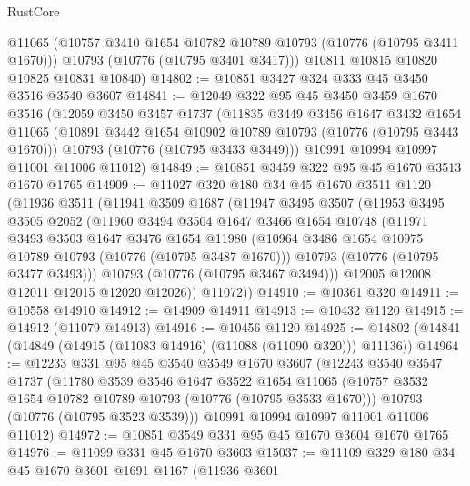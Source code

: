 \begin{lexlean}{RustCore}
\begin{coremodule}
        @11065
        (@10757 @3410 @1654 @10782 @10789 @10793 (@10776 (@10795 @3411 @1670)))
        @10793
        (@10776 (@10795 @3401 @3417)))
      @10811
      @10815
      @10820
      @10825
      @10831
      @10840)
@14802 := @10851 @3427 @324 @333 @45 @3450 @3516 @3540 @3607
@14841 := @12049
    @322
    @95
    @45
    @3450
    @3459
    @1670
    @3516
    (@12059
      @3450
      @3457
      @1737
      (@11835
        @3449
        @3456
        @1647
        @3432
        @1654
        @11065
        (@10891 @3442 @1654 @10902 @10789 @10793 (@10776 (@10795 @3443 @1670)))
        @10793
        (@10776 (@10795 @3433 @3449)))
      @10991
      @10994
      @10997
      @11001
      @11006
      @11012)
@14849 := @10851 @3459 @322 @95 @45 @1670 @3513 @1670 @1765
@14909 := @11027
    @320
    @180
    @34
    @45
    @1670
    @3511
    @1120
    (@11936
      @3511
      (@11941
        @3509
        @1687
        (@11947
          @3495
          @3507
          (@11953
            @3495
            @3505
            @2052
            (@11960
              @3494
              @3504
              @1647
              @3466
              @1654
              @10748
              (@11971
                @3493
                @3503
                @1647
                @3476
                @1654
                @11980
                (@10964 @3486 @1654 @10975 @10789 @10793 (@10776 (@10795 @3487 @1670)))
                @10793
                (@10776 (@10795 @3477 @3493)))
              @10793
              (@10776 (@10795 @3467 @3494)))
            @12005
            @12008
            @12011
            @12015
            @12020
            @12026))
        @11072))
@14910 := @10361 @320
@14911 := @10558 @14910
@14912 := @14909 @14911
@14913 := @10432 @1120
@14915 := @14912 (@11079 @14913)
@14916 := @10456 @1120
@14925 := @14802 (@14841 (@14849 (@14915 (@11083 @14916) (@11088 (@11090 @320))) @11136))
@14964 := @12233
    @331
    @95
    @45
    @3540
    @3549
    @1670
    @3607
    (@12243
      @3540
      @3547
      @1737
      (@11780
        @3539
        @3546
        @1647
        @3522
        @1654
        @11065
        (@10757 @3532 @1654 @10782 @10789 @10793 (@10776 (@10795 @3533 @1670)))
        @10793
        (@10776 (@10795 @3523 @3539)))
      @10991
      @10994
      @10997
      @11001
      @11006
      @11012)
@14972 := @10851 @3549 @331 @95 @45 @1670 @3604 @1670 @1765
@14976 := @11099 @331 @45 @1670 @3603
@15037 := @11109
    @329
    @180
    @34
    @45
    @1670
    @3601
    @1691
    @1167
    (@11936
      @3601

\end{coremodule}
\end{lexlean}
